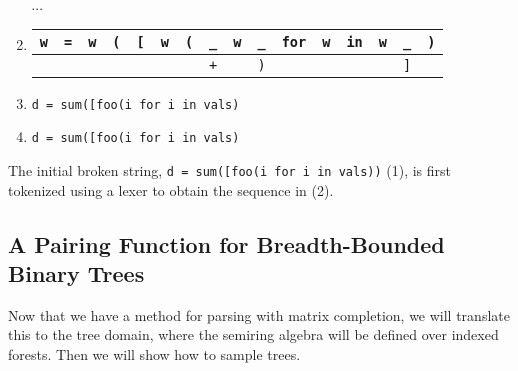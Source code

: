\documentclass[sigplan,review,anonymous,acmsmall]{acmart}\settopmatter{printfolios=false,printccs=false,printacmref=false}
\begin{document}
\begin{enumerate}[leftmargin=.23\linewidth]
\begin{tabular}{|||c|||c|||c|||c|||c|||c|||c|||c|||c|||c|||c|||c|||c|||c|||c|||}
    \end{tabular}\\$\cdots$
    \item \begin{tabular}{|||c|||c|||c|||c|||c|||c|||c||c|c|||c|||c|||c|||c|||c|||c|||c|||}
            \hline
            \texttt{w} & \texttt{=} & \texttt{w} & \texttt{(} & \texttt{[} & \texttt{w} & \texttt{(} & \cellcolor{black!15}\texttt{\_} &  \texttt{w} & \cellcolor{black!15}\texttt{\_} & \texttt{for} & \texttt{w} & \texttt{in} & \texttt{w} & \cellcolor{black!15}\texttt{\_} & \texttt{)} \\\hline
            & & & & & & & \cellcolor{green!25}\texttt{+} & & \cellcolor{orange!25}\texttt{)} & & & & & \cellcolor{orange!25}\texttt{]} & \\\hline
    \end{tabular}
    \item \texttt{d = sum([foo(\hlgreen{+}i\hlorange{)} for i in vals\hlorange{]})}
    \item \texttt{d = sum([foo(i\hlorange{)} for i in vals\hlorange{]})}
  \end{enumerate}

  The initial broken string, \texttt{d = sum([foo(i\err{]} for i in vals))} (1), is first tokenized using a lexer to obtain the sequence in (2).

  \subsection{A Pairing Function for Breadth-Bounded Binary Trees}\label{sec:pairing}

  Now that we have a method for parsing with matrix completion, we will translate this to the tree domain, where the semiring algebra will be defined over indexed forests. Then we will show how to sample trees.
\end{document}
